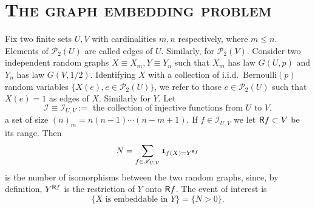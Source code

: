 \documentclass[reqno]{amsart}
\theoremstyle{theorem}
\theoremstyle{definition}
\theoremstyle{remark}
\def\P{\mathbb{P}}
\def\PP{\mathscr{P}}
\newcommand{\1}{{\text{\Large $\mathfrak 1$}}}	%
\numberwithin{equation}{section}
\def\II{\mathscr I}
\newcommand{\I}{{\text{\Large $\mathfrak 1$}}}	%
\def\ran{{\sf R}}
\begin{document}
\section{\bfseries\scshape The graph embedding problem}
Fix two finite sets $U, V$ with cardinalities $m, n$ respectively, where $m \le n$.
Elements of $\PP_2(U)$ are called edges of $U$. Similarly, for $\PP_2(V)$.
Consider two independent random graphs $X\equiv X_m, Y\equiv Y_n$ such that
$X_m$ has law $G(U,p)$ and $Y_n$ has law $G(V,1/2)$.
Identifying $X$ with a collection of i.i.d.\ Bernoulli$(p)$ random variables
$\{X(e), e \in \PP_2(U)\}$, we refer to those
$e \in \PP_2(U)$ such that $X(e)=1$ as edges of $X$.
Similarly for $Y$.
Let
\[
\II\equiv \II_{U,V} :=\text{ the collection of injective functions
from $U$ to $V$,}
\]
a set of size $(n)_m = n(n-1)\cdots(n-m+1)$.
If $f \in \II_{U,V}$ we let $\ran f \subset V$ be 
its range. Then
\begin{equation} \label{N1}
N = \sum_{f \in \II_{U,V}} \I_{f(X) = Y^{\ran f}}
\end{equation}
is the number of isomorphisms between the two random graphs, since, by 
definition, $Y^{\ran f}$ is the restriction of $Y$ onto $\ran f$.
The event of interest is
\[
\{X \text{ is embeddable in } Y\} = \{N > 0\}.
\]
\end{document}
